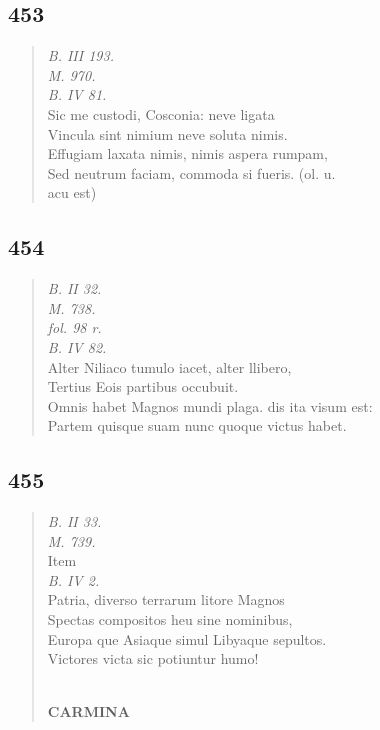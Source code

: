 \documentclass[11pt, a4paper]{report}
\begin{document}
            \subsection*{453}
      \begin{verse}
      \textit{B. III 193.} \\ \textit{M. 970.} \\ \textit{B. IV 81.} \\ Sic me custodi, Cosconia: neve ligata \\ Vincula sint nimium neve soluta nimis. \\ Effugiam laxata nimis, nimis aspera rumpam, \\ Sed neutrum faciam, commoda si fueris. (ol. u. \\ acu est) \\ 
      \end{verse}
  
            \subsection*{454}
      \begin{verse}
      \textit{B. II 32.} \\ \textit{M. 738.} \\ \textit{fol. 98 r.} \\ \textit{B. IV 82.} \\ Alter Niliaco tumulo iacet, alter llibero, \\ Tertius Eois partibus occubuit. \\ Omnis habet Magnos mundi plaga. dis  \lbrack ita visum est: \\ Partem quisque suam nunc quoque victus habet. \\ 
      \end{verse}
  
            \subsection*{455}
      \begin{verse}
      \textit{B. II 33.} \\ \textit{M. 739.} \\  \lbrack Item \rbrack  \\ \textit{B. IV 2.} \\ Patria, diverso terrarum litore Magnos \\ Spectas compositos heu sine nominibus, \\ Europa \lbrack que \rbrack  Asiaque simul Libyaque sepultos. \\ Victores victa sic potiuntur humo! \\ 
        ﻿\pagebreak 
    \begin{center} \textbf{CARMINA} \end{center} \marginpar{[338]} 
      \end{verse}
  
\end{document}
